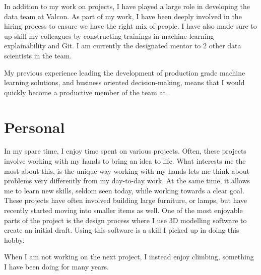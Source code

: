 \hspace{7 mm} In addition to my work on projects, I have played a large role in developing the data team at Valcon.
As part of my work, I have been deeply involved in the hiring process to ensure we have the right mix of people.
I have also made sure to up-skill my colleagues by constructing trainings in machine learning explainability and Git.
I am currently the designated mentor to 2 other data scientists in the team.

\hspace{7 mm} My previous experience leading the development of production grade machine learning solutions, and business oriented decision-making, means that I would quickly become a productive member of the team at \company{}.

\section{Personal}
In my spare time, I enjoy time spent on various projects.
Often, these projects involve working with my hands to bring an idea to life.
What interests me the most about this, is the unique way working with my hands lets me think about problems very differently from my day-to-day work.
At the same time, it allows me to learn new skills, seldom seen today, while working towards a clear goal.
These projects have often involved building large furniture, or lamps, but have recently started moving into smaller items as well.
One of the most enjoyable parts of the project is the design process where I use 3D modelling software to create an initial draft.
Using this software is a skill I picked up in doing this hobby.

\hspace{7 mm} When I am not working on the next project, I instead enjoy climbing, something I have been doing for many years.



